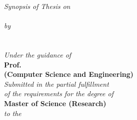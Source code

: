 \begin{titlepage}
\begin{center}
{\large {\textit{Synopsis of Thesis on}}}\\
\Large{\textbf{ \ThesisTitle}}\\
\vspace{15pt}
\normalsize \emph {by}\\
\vspace{15pt}
\Large{\textbf{\Auth}} \\
\normalsize{\textsf{\bf \Entry}}\\
\vspace{25pt}
{\normalsize \emph {Under the guidance of}} \\
\Large{\textbf{Prof. \Guide{}}} \\
\normalsize{\textsf{\bf (Computer Science and Engineering)\\ }}
\vspace{20pt}
{\normalsize \emph {Submitted in the partial fulfillment \\of the requirements for the degree of}}\\
\vspace{10pt}
{\large \textbf{Master of Science (Research)}}\\

\vspace{15pt}
{\normalsize \emph {to the}}

\vspace{10pt}


\end{center}
\end{titlepage}
